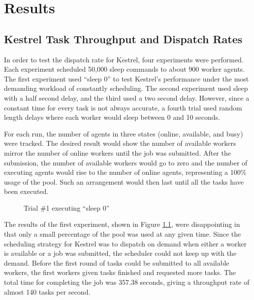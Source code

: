 \chapter{Results}
\label{chap:Results}
\section{Kestrel Task Throughput and Dispatch Rates}

In order to test the dispatch rate for Kestrel, four experiments were
performed. Each experiment scheduled 50,000 sleep commands to about
900 worker agents. The first experiment used ``sleep 0'' to test
Kestrel's performance under the most demanding workload of constantly
scheduling. The second experiment used sleep with a half second delay,
and the third used a two second delay. However, since a constant time
for every task is not always accurate, a fourth trial used random
length delays where each worker would sleep between 0 and 10 seconds. 

For each run, the number of agents in three states (online, available,
and busy) were tracked. The desired result would show the number of
available workers mirror the number of online workers until the job
was submitted. After the submission, the number of available workers
would go to zero and the number of executing agents would rise to
the number of online agents, representing a 100\% usage of the pool.
Such an arrangement would then last until all the tasks have been
executed. 

%
\begin{figure}
\caption{\label{fig:Trial1}Trial \#1 executing ``sleep 0''}
\end{figure}


The results of the first experiment, shown in Figure \ref{fig:Trial1},
were disappointing in that only a small percentage of the pool was
used at any given time. Since the scheduling strategy for Kestrel
was to dispatch on demand when either a worker is available or a job
was submitted, the scheduler could not keep up with the demand. Before
the first round of tasks could be submitted to all available workers,
the first workers given tasks finished and requested more tasks. The
total time for completing the job was 357.38 seconds, giving a throughput
rate of almost 140 tasks per second.

